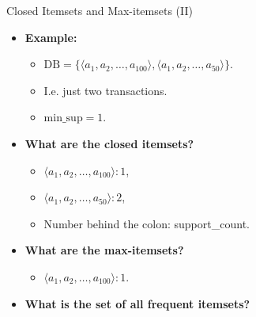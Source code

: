 \begin{frame}{Closed Itemsets and Max-itemsets (II)}
	\begin{itemize}
		\item \textbf{Example:}
		\begin{itemize}
			\item $\text{DB} = \{\langle a_1,a_2, \ldots, a_{100} \rangle, 
			\langle a_1, a_2, \ldots, a_{50} \rangle \}$.
			\item I.e. just two transactions.
			\item $\text{min\_sup} = 1$.
		\end{itemize}
		\item \textbf{What are the closed itemsets?}
		\begin{itemize}
			\item $\langle a_1,a_2, \ldots, a_{100} \rangle : 1$,
			\item $\langle a_1,a_2, \ldots, a_{50} \rangle : 2$,
			\item Number behind the colon: support\_count.
		\end{itemize}
		\item \textbf{What are the max-itemsets?}
		\begin{itemize}
			\item $\langle a_1,a_2, \ldots, a_{100} \rangle : 1$.
		\end{itemize}
		\item \textbf{What is the set of all frequent itemsets?}
	\end{itemize}
\end{frame}